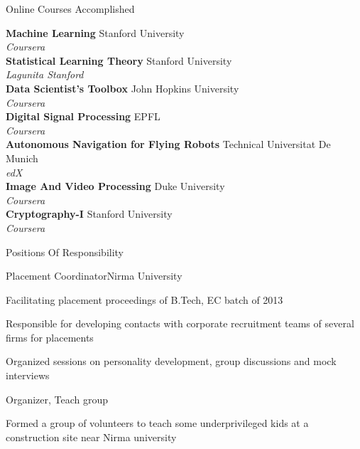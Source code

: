 \documentclass{resume} %
\begin{document}
	\begin{rSection}{Online Courses Accomplished}
		
		\textbf{Machine Learning} \hfill {Stanford University}\\
		\textit{Coursera}
		\vspace{0.1 in}
		\\
		\textbf{Statistical Learning Theory} \hfill{Stanford University}\\
		\textit{Lagunita Stanford}
		\vspace{0.1 in}
		\\
		\textbf{Data Scientist's Toolbox} \hfill {John Hopkins University}\\
		\textit{Coursera}
		\vspace{0.1 in}
		\\
		\textbf{Digital Signal Processing} \hfill{EPFL}\\
		\textit{Coursera}
		\vspace{0.1 in}
		\\
		\textbf{Autonomous Navigation for Flying Robots} \hfill{Technical Universitat De Munich}\\
		\textit{edX}
		\vspace{0.1 in}
		\\
		\textbf{Image And Video Processing} \hfill {Duke University}\\
		\textit{Coursera}
		\vspace{0.1 in}
		\\
	\textbf{Cryptography-I} \hfill {Stanford University}\\
	\textit{Coursera}
	\vspace{0.1 in}	
		\end{rSection}
		
		\begin{rSection}{Positions Of Responsibility}	%
		
		\begin{rSubsection}{Placement Coordinator}{Nirma University}{}{}
			\item Facilitating placement proceedings of B.Tech, EC batch of 2013
			\item Responsible for developing contacts with corporate recruitment teams of several firms for placements 
			\item Organized sessions on personality development, group discussions and mock interviews
		\end{rSubsection}
		
		
		\begin{rSubsection}{Organizer, Teach group}{}{}{}
		\item Formed  a group of volunteers to teach some underprivileged kids at a construction site near Nirma university 
		\end{rSubsection}
		
	\end{rSection}
	
\end{document}
